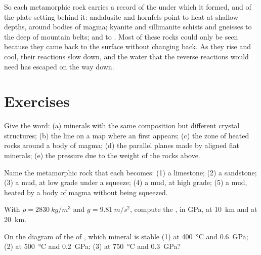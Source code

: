So each metamorphic rock carries a record of the  under which it
formed, and of the plate setting behind it: andalusite and hornfels point to
heat at shallow depths, around bodies of magma; kyanite and sillimanite
schists and gneisses to the deep  of mountain belts;  and
 to . Most of these rocks could only be seen
because they came back to the surface without changing back. As they rise
and cool, their reactions slow down, and the water that the reverse
reactions would need has escaped on the way down.

\section{Exercises}

\begin{exercise}[$\star$]\label{exo:g12:metamorphic-rocks:1}
Give the word: (a) minerals with the same composition but different crystal
structures; (b) the line on a map where an  first appears;
(c) the zone of heated rocks around a body of magma; (d) the parallel planes
made by aligned flat minerals; (e) the pressure due to the weight of the
rocks above.
\end{exercise}

\begin{exercise}[$\star$]\label{exo:g12:metamorphic-rocks:2}
Name the metamorphic rock that each  becomes: (1) a limestone;
(2) a sandstone; (3) a mud, at low grade under a squeeze; (4) a mud, at high
grade; (5) a mud, heated by a body of magma without being squeezed.
\end{exercise}

\begin{exercise}[$\star$]\label{exo:g12:metamorphic-rocks:3}
With $\rho = \qty{2830}{kg/m^3}$ and $g = \qty{9.81}{m/s^2}$, compute the
, in \unit{GPa}, at \qty{10}{km} and at \qty{20}{km}.
\end{exercise}

\begin{exercise}[$\star$]\label{exo:g12:metamorphic-rocks:4}
On the diagram of the  of , which mineral is stable
(1) at \qty{400}{\celsius} and \qty{0.6}{GPa}; (2) at \qty{500}{\celsius}
and \qty{0.2}{GPa}; (3) at \qty{750}{\celsius} and \qty{0.3}{GPa}?
\end{exercise}


